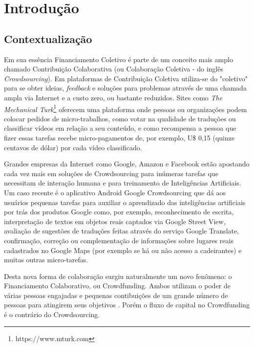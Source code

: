 \chapter{Introdução}

\section{Contextualização}
Em sua essência Financiamento Coletivo é parte de um conceito mais amplo chamado Contribuição Colaborativa (ou Colaboração Coletiva - do inglês \emph{Crowdsourcing}). Em plataformas de Contribuição Coletiva utiliza-se do "coletivo" para se obter ideias, \emph{feedback} e soluções para problemas através de uma chamada ampla via Internet e a custo zero, ou bastante reduzidos. Sites como \emph{The Mechanical Turk}\footnote{https://www.mturk.com} oferecem uma plataforma onde pessoas ou organizações podem colocar pedidos de micro-trabalhos, como votar na qualidade de traduções ou classificar vídeos em relação a seu conteúdo, e como recompensa a pessoa que fizer essas tarefas recebe micro-pagamentos de, por exemplo, U\$ 0,15 (quinze centavos de dólar) por cada vídeo classificado.

Grandes empresas da Internet como Google, Amazon e Facebook estão apostando cada vez mais em soluções de Crowdsourcing para inúmeras tarefas que necessitam de interação humana e para treinamento de Inteligências Artificiais. Um caso recente é o aplicativo Android Google Crowdsourcing \cite{cnet-google-crowdsourcing} que dá aos usuários pequenas tarefas para auxiliar o aprendizado das inteligências artificiais por trás dos produtos Google como, por exemplo, reconhecimento de escrita, interpretação de textos em objetos reais captados via Google Street View, avaliação de sugestões de traduções feitas através do serviço Google Translate, confirmação, correção ou complementação de informações sobre lugares reais cadastrados no Google Maps (por exemplo se há ou não acesso a cadeirantes) e muitas outras micro-tarefas.

Desta nova forma de colaboração surgiu naturalmente um novo fenômeno: o Financiamento Colaborativo, ou Crowdfunding. Ambos utilizam o poder de várias pessoas engajadas e pequenas contibuições de um grande número de pessoas para atingirem seus objetivos \cite{crowdfunding-culture}. Porém o fluxo de capital no Crowdfunding é o contrário do Crowdsourcing.

